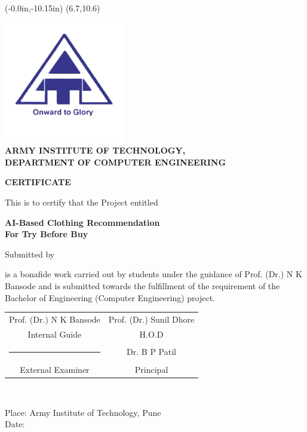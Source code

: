 \thisfancyput(-0.0in,-10.15in){
	\setlength{\unitlength}{1in}
	\framebox(6.7,10.6)
}
\setlength{\parindent}{0mm}
\begin{center}
	\includegraphics[scale=0.75]{components/images/logo.png} \\[0.5cm]
	
	{
		\bfseries \large
		ARMY INSTITUTE OF TECHNOLOGY, \\
		DEPARTMENT OF COMPUTER ENGINEERING
		\vspace*{\baselineskip}
	}

	{
		\bfseries \Large
		CERTIFICATE
		\vspace*{\baselineskip}
	}

	This is to certify that the Project entitled

	\vspace*{\baselineskip}

	{
		\bfseries \Large
		AI-Based Clothing Recommendation \\ For Try Before Buy \\
		\vspace*{\baselineskip}
	}

	Submitted by
	
	\nametable
\end{center}

is a bonafide work carried out by students under the guidance of Prof. (Dr.) N K Bansode and is submitted towards the fulfillment of the requirement of the Bachelor of Engineering (Computer Engineering) project.

\vspace*{3 \baselineskip}

{
	\bgroup
	\def\arraystretch{0.7}
	\begin{table}[h!]
		\centering
		\begin{tabular}{ c c }
		Prof. (Dr.) N K Bansode & \hspace{40 mm} Prof. (Dr.) Sunil Dhore \\
		Internal Guide & \hspace{40 mm} H.O.D \\[1.5cm]
		\vspace{0.1cm} \rule{24ex}{0.15mm} & \hspace{40 mm} Dr. B P Patil \\
		External Examiner &\hspace{40 mm}Principal\\
		\end{tabular}\\[0.5cm]
	\end{table}
}

Place: Army Institute of Technology, Pune \\
Date: 

\pagebreak
